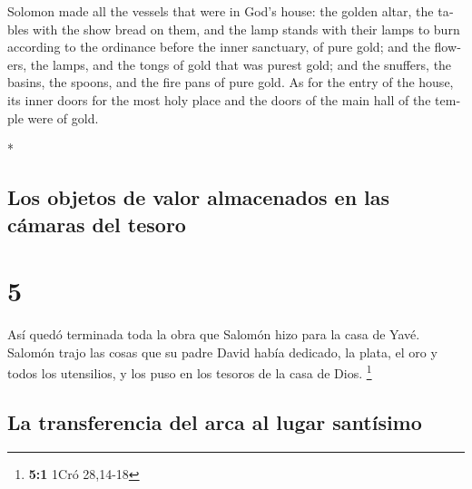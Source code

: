 \begin{paracol}{2}
\begin{otherlanguage}{english}
 Solomon made all the vessels that were in God's house:
the golden altar, the tables with the show bread on them,
 and the lamp stands with their lamps to burn according
to the ordinance before the inner sanctuary, of pure gold;
 and the flowers, the lamps, and the tongs of gold that
was purest gold;  and the snuffers, the basins, the
spoons, and the fire pans of pure gold. As for the entry of the house,
its inner doors for the most holy place and the doors of the main hall
of the temple were of gold.

\end{otherlanguage}

\switchcolumn[0]*

\hypertarget{los-objetos-de-valor-almacenados-en-las-cuxe1maras-del-tesoro}{%
\subsection{Los objetos de valor almacenados en las cámaras del
tesoro}\label{los-objetos-de-valor-almacenados-en-las-cuxe1maras-del-tesoro}}

\hypertarget{section-8}{%
\section{5}\label{section-8}}

 Así quedó terminada toda la obra que Salomón hizo para la
casa de Yavé. Salomón trajo las cosas que su padre David había dedicado,
la plata, el oro y todos los utensilios, y los puso en los tesoros de la
casa de Dios. \footnote{\textbf{5:1} 1Cró 28,14-18}

\hypertarget{la-transferencia-del-arca-al-lugar-santuxedsimo}{%
\subsection{La transferencia del arca al lugar
santísimo}\label{la-transferencia-del-arca-al-lugar-santuxedsimo}}


\end{paracol}
